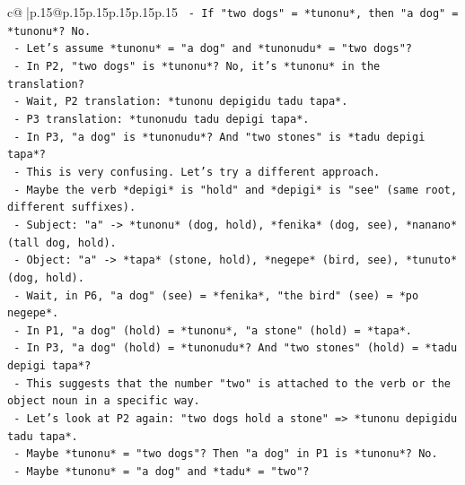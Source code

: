 \documentclass{article}
\begin{document}
{\begin{supertabular}{c@{$\;$}|p{.15\linewidth}@{}p{.15\linewidth}p{.15\linewidth}p{.15\linewidth}p{.15\linewidth}p{.15\linewidth}}
{{{\texttt{                              {-} If "two dogs" = *tunonu*, then "a dog" = *tunonu*? No.} \\
\texttt{                              {-} Let's assume *tunonu* = "a dog" and *tunonudu* = "two dogs"?} \\
\texttt{                              {-} In P2, "two dogs" is *tunonu*? No, it's *tunonu* in the translation?} \\
\texttt{                              {-} Wait, P2 translation: *tunonu depigidu tadu tapa*.} \\
\texttt{                              {-} P3 translation: *tunonudu tadu depigi tapa*.} \\
\texttt{                              {-} In P3, "a dog" is *tunonudu*? And "two stones" is *tadu depigi tapa*?} \\
\texttt{                              {-} This is very confusing. Let's try a different approach.} \\
\texttt{                              {-} Maybe the verb *depigi* is "hold" and *depigi* is "see" (same root, different suffixes).} \\
\texttt{                              {-} Subject: "a" {-}> *tunonu* (dog, hold), *fenika* (dog, see), *nanano* (tall dog, hold).} \\
\texttt{                              {-} Object: "a" {-}> *tapa* (stone, hold), *negepe* (bird, see), *tunuto* (dog, hold).} \\
\texttt{                              {-} Wait, in P6, "a dog" (see) = *fenika*, "the bird" (see) = *po negepe*.} \\
\texttt{                              {-} In P1, "a dog" (hold) = *tunonu*, "a stone" (hold) = *tapa*.} \\
\texttt{                              {-} In P3, "a dog" (hold) = *tunonudu*? And "two stones" (hold) = *tadu depigi tapa*?} \\
\texttt{                              {-} This suggests that the number "two" is attached to the verb or the object noun in a specific way.} \\
\texttt{                              {-} Let's look at P2 again: "two dogs hold a stone" => *tunonu depigidu tadu tapa*.} \\
\texttt{                                {-} Maybe *tunonu* = "two dogs"? Then "a dog" in P1 is *tunonu*? No.} \\
\texttt{                                {-} Maybe *tunonu* = "a dog" and *tadu* = "two"?} \\
}}}
\end{supertabular}}
\end{document}
